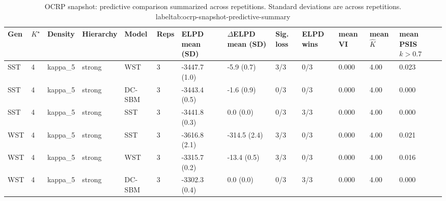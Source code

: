 \begin{table}[!h]
\centering
\caption{OCRP snapshot: predictive comparison summarized across repetitions. Standard deviations are across repetitions.\\label{tab:ocrp-snapshot-predictive-summary}}
\centering
\begin{tabular}[t]{lllllllllllll}
\toprule
Gen & $K^\star$ & Density & Hierarchy & Model & Reps & ELPD mean (SD) & $\Delta$ELPD mean (SD) & Sig. loss & ELPD wins & mean VI & mean $\hat K$ & mean PSIS $k>0.7$\\
\midrule
SST & 4 & kappa_5 & strong & WST & 3 & -3447.7 (1.0) & -5.9 (0.7) & 3/3 & 0/3 & 0.000 & 4.00 & 0.023\\
SST & 4 & kappa_5 & strong & DC-SBM & 3 & -3443.4 (0.5) & -1.6 (0.9) & 0/3 & 0/3 & 0.000 & 4.00 & 0.000\\
SST & 4 & kappa_5 & strong & SST & 3 & -3441.8 (0.3) & 0.0 (0.0) & 0/3 & 3/3 & 0.000 & 4.00 & 0.000\\
WST & 4 & kappa_5 & strong & SST & 3 & -3616.8 (2.1) & -314.5 (2.4) & 3/3 & 0/3 & 0.000 & 4.00 & 0.021\\
WST & 4 & kappa_5 & strong & WST & 3 & -3315.7 (0.2) & -13.4 (0.5) & 3/3 & 0/3 & 0.000 & 4.00 & 0.016\\
WST & 4 & kappa_5 & strong & DC-SBM & 3 & -3302.3 (0.4) & 0.0 (0.0) & 0/3 & 3/3 & 0.000 & 4.00 & 0.000\\
\bottomrule
\end{tabular}
\end{table}
